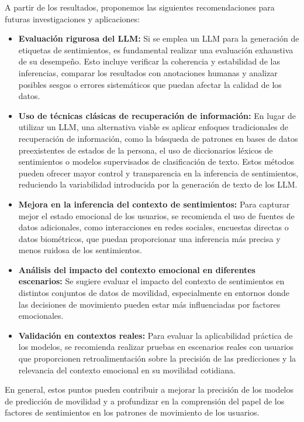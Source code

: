 \begin{recomendations}
    A partir de los resultados, proponemos las siguientes 
    recomendaciones para futuras investigaciones y aplicaciones:

\begin{itemize}
    \item \textbf{Evaluación rigurosa del LLM:} Si se emplea un LLM para 
    la generación de etiquetas de sentimientos, es fundamental realizar 
    una evaluación exhaustiva de su desempeño. Esto incluye verificar 
    la coherencia y estabilidad de las inferencias, comparar los 
    resultados con anotaciones humanas y analizar posibles sesgos o 
    errores sistemáticos que puedan afectar la calidad de los datos.
    
    \item \textbf{Uso de técnicas clásicas de recuperación de información:} 
    En lugar de utilizar un 
    LLM, una alternativa viable es aplicar enfoques tradicionales de 
    recuperación de información, como la búsqueda de patrones en 
    bases de datos preexistentes de estados de la persona, el uso de 
    diccionarios léxicos de sentimientos o modelos supervisados de 
    clasificación de texto. 
    Estos métodos pueden ofrecer mayor control y transparencia en 
    la inferencia de sentimientos, reduciendo la variabilidad 
    introducida por la generación de texto de los LLM.

   

    \item \textbf{Mejora en la inferencia del contexto de sentimientos:} 
    Para capturar mejor el estado emocional de los usuarios, se recomienda 
    el uso de fuentes de datos adicionales, como interacciones en redes 
    sociales, encuestas directas o datos biométricos, que puedan 
    proporcionar una inferencia más precisa y menos ruidosa de los 
    sentimientos.
    
    \item \textbf{Análisis del impacto del contexto emocional en 
    diferentes escenarios:} Se sugiere evaluar el impacto del contexto 
    de sentimientos en distintos conjuntos de datos de movilidad, 
    especialmente en entornos donde las decisiones de movimiento pueden 
    estar más influenciadas por factores emocionales.
    
    \item \textbf{Validación en contextos reales:} Para evaluar la 
    aplicabilidad práctica de los modelos, se recomienda realizar 
    pruebas en escenarios reales con usuarios que proporcionen 
    retroalimentación sobre la precisión de las predicciones y 
    la relevancia del contexto emocional en su movilidad cotidiana.
\end{itemize}

En general, estos puntos pueden contribuir a mejorar la precisión de 
los modelos de predicción de movilidad y a profundizar en la 
comprensión del papel de los factores de sentimientos en los patrones 
de movimiento de los usuarios.

\end{recomendations}
